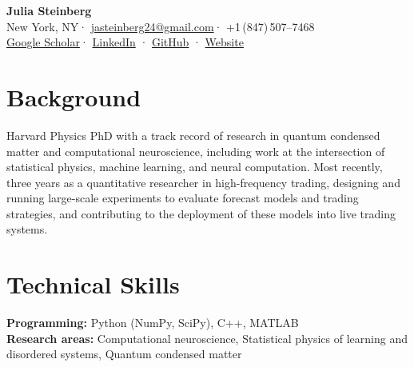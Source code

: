 \documentclass[11pt, letterpaper]{article}
\begin{document}

\begin{center}
  {\LARGE\bfseries Julia Steinberg}\\[5pt]
  {\small
    New York, NY\enspace·\enspace
    \href{mailto:jasteinberg24@gmail.com}{jasteinberg24@gmail.com}\enspace·\enspace
    +1\,(847)\,507--7468\\[2pt]
    \href{https://scholar.google.com}{Google Scholar}\enspace·\enspace
    \href{https://linkedin.com}{LinkedIn}
    \enspace·\enspace
    \href{https://github.com/jasteinberg}{GitHub}
    \enspace·\enspace
    \href{https://jasteinberg.github.io}{Website}
  }
\end{center}

\vspace{4pt}
\section{Background}

Harvard Physics PhD with a track record of research in quantum condensed matter and computational neuroscience, including work at the intersection of statistical physics, machine learning, and neural computation. Most recently, three years as a quantitative researcher in high-frequency trading, designing and running large-scale experiments to evaluate forecast models and trading strategies, and contributing to the deployment of these models into live trading systems.

\section{Technical Skills}

\noindent\textbf{Programming:} Python (NumPy, SciPy), C++, MATLAB\\
\textbf{Research areas:} Computational neuroscience, Statistical physics of learning and disordered systems, Quantum condensed matter

\end{document}
